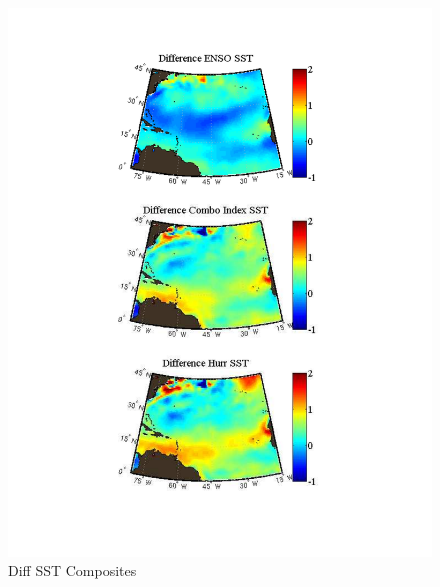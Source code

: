 \documentclass[]{article}
\begin{document}
\begin{figure}[ht]
\begin{minipage}[b]{0.55\linewidth}
\includegraphics[width=\textwidth]{figures/comboIndex/composites/compareMDRCompositesSST.pdf}
\caption{Diff SST Composites}
\label{fig:figure22}
\end{minipage}
\end{figure}
\end{document}
